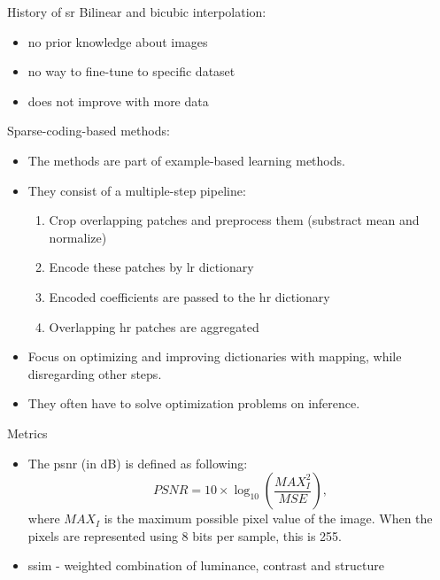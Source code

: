 \documentclass[hyperref={unicode}, xcolor=dvipsnames, t]{beamer}
\begin{document}
\begin{frame}{History of \gls{sr}}
Bilinear and \alert{bicubic} interpolation:
\begin{itemize}
    \item no \alert{prior knowledge} about images
    \item no way to \alert{fine-tune to specific dataset}
    \item does not improve with \alert{more data}
\end{itemize}

Sparse-coding-based methods:
\begin{itemize}
    \item The methods are part of example-based learning methods.
    \item They consist of a \alert{multiple-step pipeline}:
    \begin{enumerate}
        \item Crop overlapping patches and preprocess them (substract mean and normalize)
        \item Encode these patches by \gls{lr} dictionary
        \item Encoded coefficients are passed to the \gls{hr} dictionary
        \item Overlapping \gls{hr} patches are aggregated
    \end{enumerate}
    \item Focus on optimizing and improving dictionaries with mapping, while \alert{disregarding other steps}.
    \item They often have to solve \alert{optimization problems on inference}.
    
\end{itemize}
\end{frame}

\begin{frame}{Metrics}
    \begin{itemize}
        \item The \gls{psnr} (in dB) is defined as following:
        $$ PSNR =  10\times\log_{10} \left(\frac{MAX^2_I}{MSE}\right), $$
        where $MAX_I$ is the maximum possible pixel value of the image. When the pixels are represented using 8 bits per sample, this is 255. 
        \item \gls{ssim} - weighted combination of luminance, contrast and structure
    \end{itemize}
\end{frame}
\end{document}
